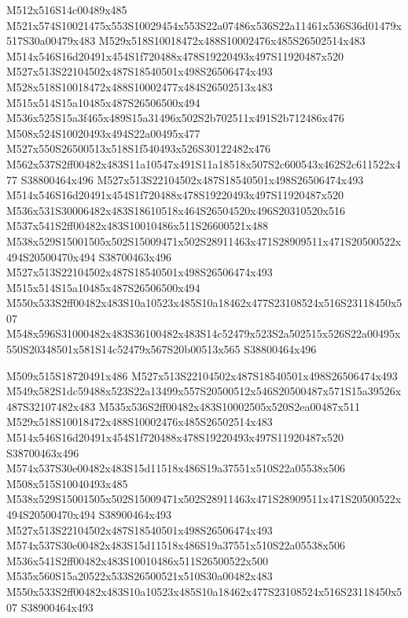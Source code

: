 \documentclass{article}
\begin{document}
\begin{multicols}{2}
M512x516S14c00489x485 M521x574S10021475x553S10029454x553S22a07486x536S22a11461x536S36d01479x517S30a00479x483 M529x518S10018472x488S10002476x485S26502514x483 M514x546S16d20491x454S1f720488x478S19220493x497S11920487x520 M527x513S22104502x487S18540501x498S26506474x493 M528x518S10018472x488S10002477x484S26502513x483 M515x514S15a10485x487S26506500x494 M536x525S15a3f465x489S15a31496x502S2b702511x491S2b712486x476 M508x524S10020493x494S22a00495x477 M527x550S26500513x518S1f540493x526S30122482x476 M562x537S2ff00482x483S11a10547x491S11a18518x507S2c600543x462S2c611522x477 S38800464x496 M527x513S22104502x487S18540501x498S26506474x493 M514x546S16d20491x454S1f720488x478S19220493x497S11920487x520 M536x531S30006482x483S18610518x464S26504520x496S20310520x516 M537x541S2ff00482x483S10010486x511S26600521x488 M538x529S15001505x502S15009471x502S28911463x471S28909511x471S20500522x494S20500470x494 S38700463x496 M527x513S22104502x487S18540501x498S26506474x493 M515x514S15a10485x487S26506500x494 M550x533S2ff00482x483S10a10523x485S10a18462x477S23108524x516S23118450x507 M548x596S31000482x483S36100482x483S14c52479x523S2a502515x526S22a00495x550S20348501x581S14c52479x567S20b00513x565 S38800464x496

M509x515S18720491x486 M527x513S22104502x487S18540501x498S26506474x493 M549x582S1dc59488x523S22a13499x557S20500512x546S20500487x571S15a39526x487S32107482x483 M535x536S2ff00482x483S10002505x520S2ea00487x511 M529x518S10018472x488S10002476x485S26502514x483 M514x546S16d20491x454S1f720488x478S19220493x497S11920487x520 S38700463x496 M574x537S30e00482x483S15d11518x486S19a37551x510S22a05538x506 M508x515S10040493x485 M538x529S15001505x502S15009471x502S28911463x471S28909511x471S20500522x494S20500470x494 S38900464x493 M527x513S22104502x487S18540501x498S26506474x493 M574x537S30e00482x483S15d11518x486S19a37551x510S22a05538x506 M536x541S2ff00482x483S10010486x511S26500522x500 M535x560S15a20522x533S26500521x510S30a00482x483 M550x533S2ff00482x483S10a10523x485S10a18462x477S23108524x516S23118450x507 S38900464x493


\end{multicols}
\end{document}
